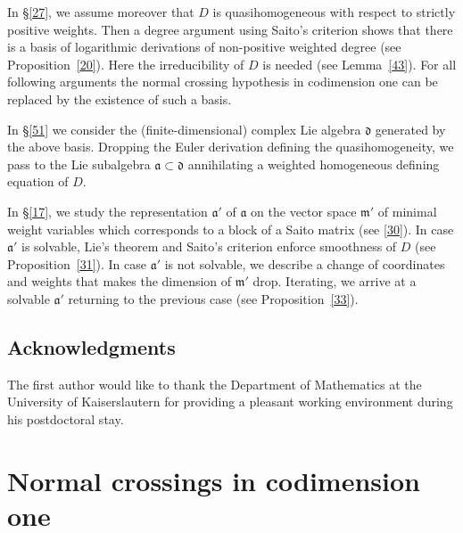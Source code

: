 In \S\ref{27}, we assume moreover that $D$ is quasihomogeneous with respect to strictly positive weights.
Then a degree argument using Saito's criterion shows that there is a basis of logarithmic derivations of non-positive weighted degree (see Proposition~\ref{20}).
Here the irreducibility of $D$ is needed (see Lemma~\ref{43}).
For all following arguments the normal crossing hypothesis in codimension one can be replaced by the existence of such a basis.

In \S\ref{51} we consider the (finite-dimensional) complex Lie algebra ${\mathfrak{d}}$ generated by the above basis.
Dropping the Euler derivation defining the quasihomogeneity, we pass to the Lie subalgebra ${\mathfrak{a}}\subset{\mathfrak{d}}$ annihilating a weighted homogeneous defining equation of $D$.

In \S\ref{17}, we study the representation ${\mathfrak{a}}'$ of ${\mathfrak{a}}$ on the vector space ${\mathfrak{m}}'$ of minimal weight variables which corresponds to a block of a Saito matrix (see \eqref{30}).
In case ${\mathfrak{a}}'$ is solvable, Lie's theorem and Saito's criterion enforce smoothness of $D$ (see Proposition~\ref{31}).
In case ${\mathfrak{a}}'$ is not solvable, we describe a change of coordinates and weights that makes the dimension of ${\mathfrak{m}}'$ drop.
Iterating, we arrive at a solvable ${\mathfrak{a}}'$ returning to the previous case (see Proposition~\ref{33}).

\subsection*{Acknowledgments}

The first author would like to thank the Department of Mathematics at
the University of Kaiserslautern for providing a pleasant working
environment during his postdoctoral stay.

\section{Normal crossings in codimension one}\label{22}

